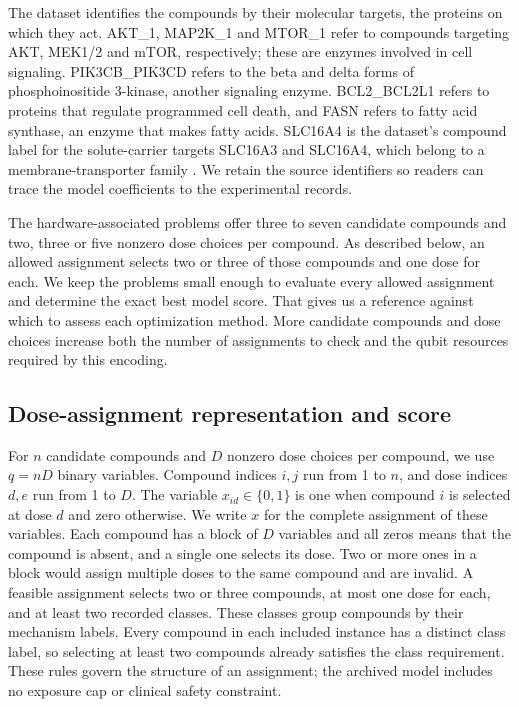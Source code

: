 \documentclass[utf8]{FrontiersinHarvard}
\begin{document}
The dataset identifies the compounds by their molecular targets, the proteins on which they act. AKT\_1, MAP2K\_1 and MTOR\_1 refer to compounds targeting AKT, MEK1/2 and mTOR, respectively; these are enzymes involved in cell signaling. PIK3CB\_PIK3CD refers to the beta and delta forms of phosphoinositide 3-kinase, another signaling enzyme. BCL2\_BCL2L1 refers to proteins that regulate programmed cell death, and FASN refers to fatty acid synthase, an enzyme that makes fatty acids. SLC16A4 is the dataset's compound label for the solute-carrier targets SLC16A3 and SLC16A4, which belong to a membrane-transporter family \citep{ncbigene2026}. We retain the source identifiers so readers can trace the model coefficients to the experimental records.

The hardware-associated problems offer three to seven candidate compounds and two, three or five nonzero dose choices per compound. As described below, an allowed assignment selects two or three of those compounds and one dose for each. We keep the problems small enough to evaluate every allowed assignment and determine the exact best model score. That gives us a reference against which to assess each optimization method. More candidate compounds and dose choices increase both the number of assignments to check and the qubit resources required by this encoding.

\subsection{Dose-assignment representation and score}
For $n$ candidate compounds and $D$ nonzero dose choices per compound, we use $q=nD$ binary variables. Compound indices $i,j$ run from 1 to $n$, and dose indices $d,e$ run from 1 to $D$. The variable $x_{id}\in\{0,1\}$ is one when compound $i$ is selected at dose $d$ and zero otherwise. We write $x$ for the complete assignment of these variables. Each compound has a block of $D$ variables and all zeros means that the compound is absent, and a single one selects its dose. Two or more ones in a block would assign multiple doses to the same compound and are invalid. A feasible assignment selects two or three compounds, at most one dose for each, and at least two recorded classes. These classes group compounds by their mechanism labels. Every compound in each included instance has a distinct class label, so selecting at least two compounds already satisfies the class requirement. These rules govern the structure of an assignment; the archived model includes no exposure cap or clinical safety constraint.
\end{document}
